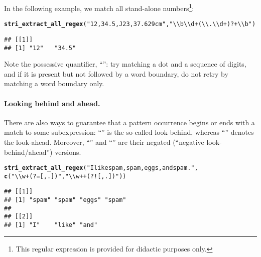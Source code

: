 \documentclass[nojss]{jss}\usepackage[]{graphicx}\usepackage[]{xcolor}
\makeatletter
\newcommand{\hlstr}[1]{\textcolor[rgb]{0.192,0.494,0.8}{#1}}%
\newcommand{\hlstd}[1]{\textcolor[rgb]{0.345,0.345,0.345}{#1}}%
\newcommand{\hlkwd}[1]{\textcolor[rgb]{0.737,0.353,0.396}{\textbf{#1}}}%
\newenvironment{kframe}{%
 \def\at@end@of@kframe{}%
 \ifinner\ifhmode%
  \def\at@end@of@kframe{\end{minipage}}%
  \begin{minipage}{\columnwidth}%
 \fi\fi%
 \def\FrameCommand##1{\hskip\@totalleftmargin \hskip-\fboxsep
 \colorbox{shadecolor}{##1}\hskip-\fboxsep
     \hskip-\linewidth \hskip-\@totalleftmargin \hskip\columnwidth}%
 \MakeFramed {\advance\hsize-\width
   \@totalleftmargin\z@ \linewidth\hsize
   \@setminipage}}%
 {\par\unskip\endMakeFramed%
 \at@end@of@kframe}
\newenvironment{knitrout}{}{} %
\makeatother
\begin{document}
In the following example, we match
all stand-alone numbers\footnote{This regular expression
is provided for didactic purposes only.}:


\begin{knitrout}
\color{fgcolor}\begin{kframe}
\begin{alltt}
\hlkwd{stri_extract_all_regex}\hlstd{(}\hlstr{"12, 34.5, J23, 37.629cm"}\hlstd{,} \hlstr{"\textbackslash{}\textbackslash{}b\textbackslash{}\textbackslash{}d+(\textbackslash{}\textbackslash{}.\textbackslash{}\textbackslash{}d+)?+\textbackslash{}\textbackslash{}b"}\hlstd{)}
\end{alltt}
\begin{verbatim}
## [[1]]
## [1] "12"   "34.5"
\end{verbatim}
\end{kframe}
\end{knitrout}

Note the possessive quantifier, ``'':
try matching a dot and a sequence of digits,
and if it is present but not followed by a word boundary,
do not retry by matching a word boundary only.



\paragraph{Looking behind and ahead.}
There are also ways to guarantee that a pattern occurrence
begins or ends with a match to some subexpression:
``'' is the so-called  look-behind, whereas
``'' denotes the look-ahead.
Moreover, ``'' and ``'' are
their negated (``negative look-behind/ahead'') versions.



\begin{knitrout}
\color{fgcolor}\begin{kframe}
\begin{alltt}
\hlkwd{stri_extract_all_regex}\hlstd{(}\hlstr{"I like spam, spam, eggs, and spam."}\hlstd{,}
  \hlkwd{c}\hlstd{(}\hlstr{"\textbackslash{}\textbackslash{}w+(?=[,.])"}\hlstd{,} \hlstr{"\textbackslash{}\textbackslash{}w++(?![,.])"}\hlstd{))}
\end{alltt}
\begin{verbatim}
## [[1]]
## [1] "spam" "spam" "eggs" "spam"
## 
## [[2]]
## [1] "I"    "like" "and"
\end{verbatim}
\end{kframe}
\end{knitrout}
\end{document}
